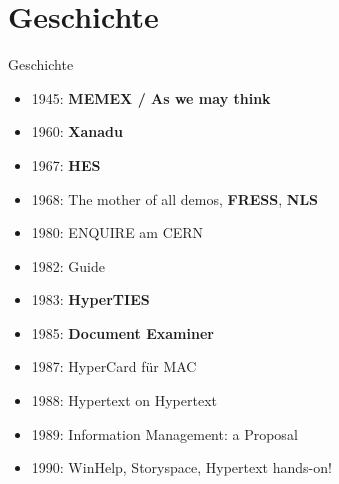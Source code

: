 \section{Geschichte}
\begin{frame}{Geschichte}
\begin{itemize}
	\item 1945: \textbf{MEMEX / As we may think}
	\item 1960: \textbf{Xanadu}
	\item 1967: \textbf{HES}
	\item 1968: The mother of all demos, \textbf{FRESS}, \textbf{NLS}
	\item 1980: ENQUIRE am CERN
	\item 1982: Guide
	\item 1983: \textbf{HyperTIES}
	\item 1985: \textbf{Document Examiner}
	\item 1987: HyperCard für MAC
	\item 1988: Hypertext on Hypertext
	\item 1989: Information Management: a Proposal
	\item 1990: WinHelp, Storyspace, Hypertext hands-on!
\end{itemize}
\end{frame}